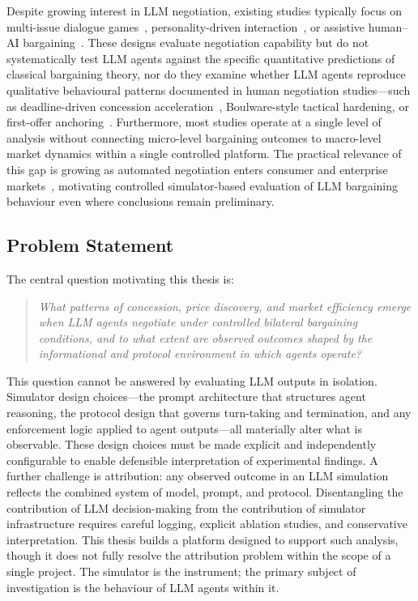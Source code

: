 Despite growing interest in LLM negotiation, existing studies typically
focus on multi-issue dialogue games~\cite{lewis2017dealornodeal,
abdelnabi2024llmdeliberation}, personality-driven
interaction~\cite{mao2024personalities}, or assistive human--AI
bargaining~\cite{chawla2023assistive}.  These designs evaluate negotiation
capability but do not systematically test LLM agents against the specific
quantitative predictions of classical bargaining theory, nor do they
examine whether LLM agents reproduce qualitative behavioural patterns
documented in human negotiation studies---such as deadline-driven
concession acceleration~\cite{roth1988deadline}, Boulware-style
tactical hardening, or first-offer anchoring~\cite{galinsky2001}.
Furthermore, most studies operate at a single level of analysis without
connecting micro-level bargaining outcomes to macro-level market dynamics
within a single controlled platform.  The practical relevance of this gap
is growing as automated negotiation enters consumer and enterprise
markets~\cite{davidson2024automatedrisky}, motivating controlled
simulator-based evaluation of LLM bargaining behaviour even where
conclusions remain preliminary.

\subsection{Problem Statement}

The central question motivating this thesis is:

\begin{quote}
\textit{What patterns of concession, price discovery, and market efficiency
emerge when LLM agents negotiate under controlled bilateral bargaining
conditions, and to what extent are observed outcomes shaped by the
informational and protocol environment in which agents operate?}
\end{quote}

This question cannot be answered by evaluating LLM outputs in isolation.
Simulator design choices---the prompt architecture that structures agent
reasoning, the protocol design that governs turn-taking and termination, and
any enforcement logic applied to agent outputs---all materially alter what
is observable.  These design choices must be made explicit and independently
configurable to enable defensible interpretation of experimental findings.
A further challenge is attribution: any observed outcome in an LLM
simulation reflects the combined system of model, prompt, and protocol.
Disentangling the contribution of LLM decision-making from the contribution
of simulator infrastructure requires careful logging, explicit ablation
studies, and conservative interpretation.  This thesis builds a platform
designed to support such analysis, though it does not fully resolve the
attribution problem within the scope of a single project.  The simulator
is the instrument; the primary subject of investigation is the behaviour of
LLM agents within it.

